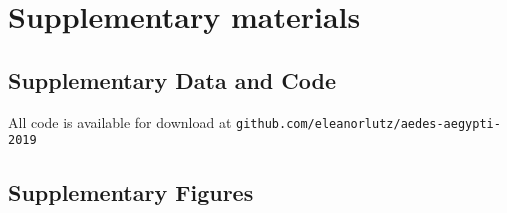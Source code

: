 \documentclass[preprint,10pt,twocolumn]{elsarticle}
\newcommand{\beginsupplement}{
    \setcounter{table}{0}
    \renewcommand{\thetable}{S\arabic{table}}
    \setcounter{figure}{0}
    \renewcommand{\thefigure}{S\arabic{figure}}}
\begin{document}







\clearpage
\nolinenumbers 
\begin{flushleft}


\end{flushleft}

\linenumbers
\newpage \onecolumn \beginsupplement
\nolinenumbers \section*{Supplementary materials}
\normalsize
\subsection*{Supplementary Data and Code}
\noindent All code is available for download at \texttt{github.com/eleanorlutz/aedes-aegypti-2019}
\subsection*{Supplementary Figures}




\end{document}
